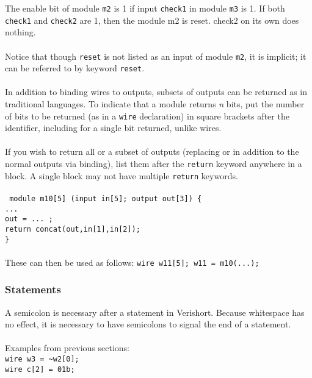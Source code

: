 \documentclass[letterpaper,11pt]{article}
\newcommand{\tab}{\hspace*{2em}}
\begin{document}
        The enable bit of module \texttt{m2} is 1 if input \texttt{check1} in module \texttt{m3} is 1. If both 
        \texttt{check1} and \texttt{check2} are 1, then the module m2 is reset. check2 on its own does nothing.\\\\
        Notice that though \texttt{reset} is not listed as an input of module  \texttt{m2}, it is implicit; it can be 
        referred to by keyword \texttt{reset}.	\\\\
        In addition to binding wires to outputs, subsets of outputs can be returned as in traditional 
        languages.  To indicate that a module returns \emph{n} bits, put the number of bits to be returned 
        (as in a \texttt{wire} declaration) in square brackets after the identifier, including for a single 
        bit returned, unlike wires.\\\\  
        If you wish to return all or a subset of outputs (replacing or in addition to the normal outputs 
        via binding), list them after the \texttt{return} keyword anywhere in a block.  A single block may not 
        have multiple \texttt{return} keywords. \\\\
        \texttt{
        module m10[5] (input in[5]; output out[3]) \{ \\
        \tab ... \\
        \tab out = ... ; \\
        \tab return concat(out,in[1],in[2]); \\
        \}}\\\\
        These can then be used as follows:
        \texttt{wire w11[5]; w11 = m10(...);}
        
        \subsubsection{Statements}
        A semicolon is necessary after a statement in Verishort.  Because whitespace has no effect, it is 
        necessary to have semicolons to signal the end of a statement.\\\\
        Examples from previous sections:\\
        \texttt{wire w3 = \textasciitilde w2[0];}\\
        \texttt{wire c[2] = 01b;} \\\\
        
\end{document}
